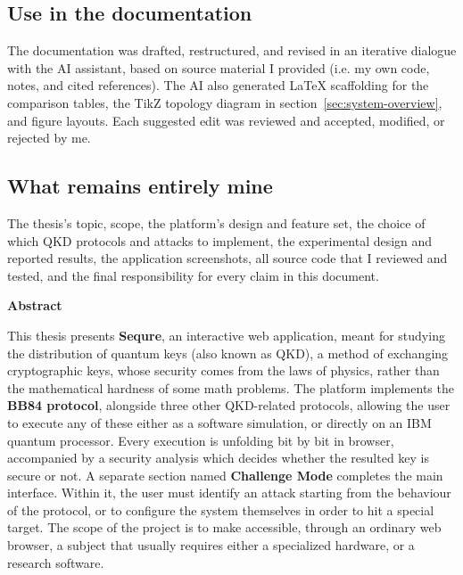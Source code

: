 \documentclass[12pt, a4paper]{article}
\begin{document}
\subsection*{Use in the documentation}

The documentation was drafted, restructured, and revised in an iterative
dialogue with the AI assistant, based on source material I provided (i.e. my own code, notes, and cited references). The AI also generated LaTeX
scaffolding for the comparison tables, the TikZ topology diagram in
section~\ref{sec:system-overview}, and figure layouts. Each suggested
edit was reviewed and accepted, modified, or rejected by me.

\subsection*{What remains entirely mine}

The thesis's topic, scope, the platform's design and feature set, the
choice of which QKD protocols and attacks to implement, the experimental
design and reported results, the application screenshots, all source
code that I reviewed and tested, and the final responsibility for every
claim in this document.


\newpage
\thispagestyle{plain}
\begin{center}
  {\Large \textbf{Abstract}}
\end{center}
\vspace{10pt} 

\noindent

This thesis presents \textbf{Sequre}, an interactive web application, meant for studying the distribution of quantum keys (also known as QKD), a method of exchanging cryptographic keys, whose security comes from the laws of physics, rather than the mathematical hardness of some math problems. 
The platform implements the \textbf{BB84 protocol}, alongside three other QKD-related protocols, allowing the user to execute any of these either as a software simulation, or directly on an IBM quantum processor. Every execution is unfolding bit by bit in browser, accompanied by a security analysis which decides whether the resulted key is secure or not. 
A separate section named \textbf{Challenge Mode} completes the main interface. Within it, the user must identify an attack starting from the behaviour of the protocol, or to configure the system themselves in order to hit a special target. The scope of the project is to make accessible, through an ordinary web browser, a subject that usually requires either a specialized hardware, or a research software.
\end{document}
